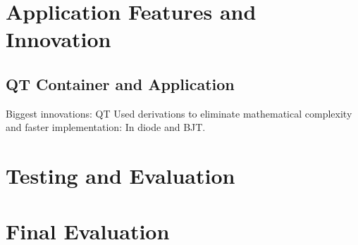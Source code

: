 \documentclass{article}
\begin{document}
\newpage

\section{Application Features and Innovation}
\subsection{QT Container and Application}
Biggest innovations: 
QT
Used derivations to eliminate mathematical complexity and faster implementation: In diode and BJT. 



\section{Testing and Evaluation}

\section{Final Evaluation}

\newpage



\end{document}
